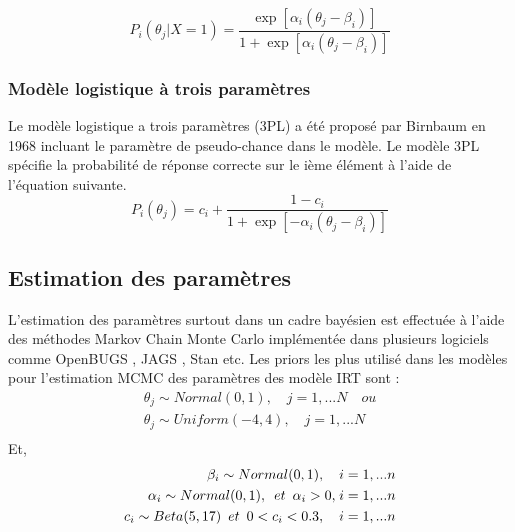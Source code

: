 \begin{equation}
    P_{i}(\theta_{j} | X=1) = \frac{\exp \left[ \alpha_{i}(\theta_{j}-\beta_{i}) \right]  }{1+ \exp \left[ \alpha_{i}(\theta_{j}-\beta_{i}) \right]  } 
	\label{2pl_model_equation}
\end{equation}

\subsubsection{Modèle logistique à trois paramètres}
Le modèle logistique a trois paramètres (3PL) a été proposé par Birnbaum en 1968 incluant le paramètre de pseudo-chance dans le modèle. Le modèle 3PL spécifie la probabilité de réponse correcte sur le ième élément à l'aide de l'équation suivante. \\

\begin{equation}
    P_{i}(\theta_{j}) = c_{i} +  \frac{1 - c_{i}}{1+ \exp \left[ -\alpha_{i}(\theta_{j}-\beta_{i}) \right]  } 
	\label{3pl_model_equation}
\end{equation}

\subsection{Estimation des paramètres}
L'estimation des paramètres surtout dans un cadre bayésien est effectuée à l’aide des méthodes Markov Chain Monte Carlo implémentée dans plusieurs logiciels comme OpenBUGS \cite{lunn2009bugs}, JAGS \cite{plummer2003jags}, Stan \cite{stan} etc. Les priors les plus utilisé dans les modèles pour l'estimation MCMC des paramètres des modèle IRT sont : \\

\begin{equation}
	\begin{split}
		\theta_{j} \sim Normal(0,1), \hspace{1em} j = 1,...N \hspace{1em} ou \\
		\theta_{j} \sim Uniform(-4,4), \hspace{1em} j = 1,...N  \\
	\end{split}	
	\label{prior_subjects}
\end{equation}
\noindent Et,
\begin{equation}
	\begin{split}
		\beta_{i} \sim Normal(0,1), \hspace{1em} i = 1,...n \\
		\alpha_{i} \sim Normal(0,1), \hspace{0.5em} et \hspace{0.5em} \alpha_{i} > 0 , \hspace{0.1em} i = 1,...n \\
		c_{i} \sim Beta(5,17) \hspace{0.5em}  et \hspace{0.5em} 0<c_{i}<0.3, \hspace{1em} i = 1,...n 
	\end{split}	
	\label{prior_items}
\end{equation}

